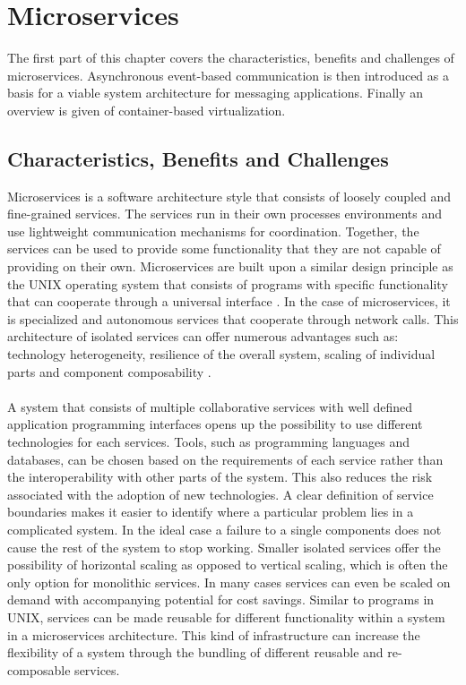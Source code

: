 \chapter{Microservices}
\label{chapter:microservices}

The first part of this chapter covers the characteristics, benefits and challenges of microservices. Asynchronous event-based communication is then introduced as a basis for a viable system architecture for messaging applications. Finally an overview is given of container-based virtualization.

\section{Characteristics, Benefits and Challenges}

Microservices is a software architecture style that consists of loosely coupled and fine-grained services. The services run in their own processes environments and use lightweight communication mechanisms for coordination. Together, the services can be used to provide some functionality that they are not capable of providing on their own. Microservices are built upon a similar design principle as the UNIX operating system that consists of programs with specific functionality that can cooperate through a universal interface \cite{raymond2003art}. In the case of microservices, it is specialized and autonomous services that cooperate through network calls. This architecture of isolated services can offer numerous advantages such as: technology heterogeneity, resilience of the overall system, scaling of individual parts and component composability \cite{newman2015building}.
\\ \\
A system that consists of multiple collaborative services with well defined application programming interfaces opens up the possibility to use different technologies for each services. Tools, such as programming languages and databases, can be chosen based on the requirements of each service rather than the interoperability with other parts of the system. This also reduces the risk associated with the adoption of new technologies. A clear definition of service boundaries makes it easier to identify where a particular problem lies in a complicated system. In the ideal case a failure to a single components does not cause the rest of the system to stop working. Smaller isolated services offer the possibility of horizontal scaling as opposed to vertical scaling, which is often the only option for monolithic services. In many cases services can even be scaled on demand with accompanying potential for cost savings. Similar to programs in UNIX, services can be made reusable for different functionality within a system in a microservices architecture. This kind of infrastructure can increase the flexibility of a system through the bundling of different reusable and re-composable services.
